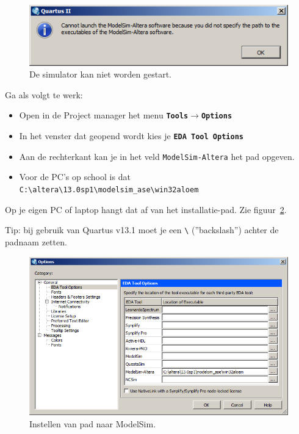 \documentclass[a4paper,12pt,fleqn,twoside]{book}
\def\tutpicscale{0.455}
\newcommand{\menu}[1]{\texttt{\textbf{#1}}}
\newcommand{\naam}[1]{\texttt{#1}}
\def\pijl{$\rightarrow$}%
\begin{document}
\begin{figure}[H]
\centering
\includegraphics[scale=\tutpicscale]{210modelsimpath_121.png}
\caption{De simulator kan niet worden gestart.}
\label{fig:210modelsimpath_121}
\end{figure}

Ga als volgt te werk:

\begin{itemize}\itemsep-1pt
\item Open in de Project manager het menu \menu{Tools\pijl{}Options}
\item In het venster dat geopend wordt kies je \menu{EDA Tool Options}
\item Aan de rechterkant kan je in het veld \naam{ModelSim-Altera} het pad opgeven.
\item Voor de PC's op school is dat \lstinline|C:\altera\13.0sp1\modelsim_ase\win32aloem|
\end{itemize}

Op je eigen PC of laptop hangt dat af van het installatie-pad. Zie
figuur~\ref{fig:212modelsimpath2}.

Tip: bij gebruik van Quartus v13.1 moet je een \lstinline|\| (''backslash'')
achter de padnaam zetten.

\begin{figure}[H]
\centering
\includegraphics[scale=\tutpicscale]{212modelsimpath2.png}
\caption{Instellen van pad naar ModelSim.}
\label{fig:212modelsimpath2}
\end{figure}
\end{document}
